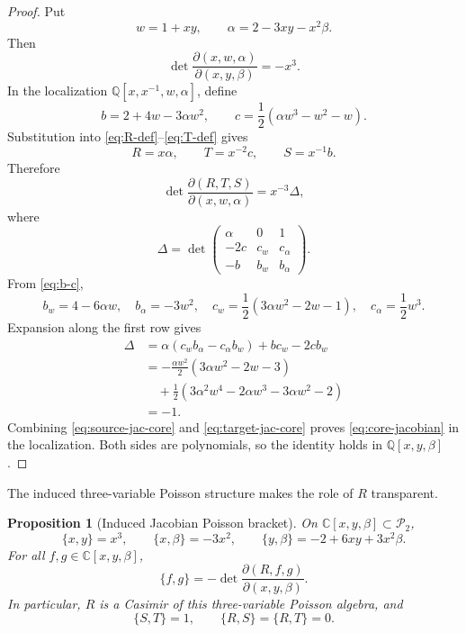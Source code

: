 \documentclass[11pt]{article}
\newcommand{\C}{\mathbb C}
\newcommand{\Q}{\mathbb Q}
\newcommand{\Pcal}{\mathcal P}
\newtheorem{proposition}[theorem]{Proposition}
\theoremstyle{remark}
\begin{document}
\begin{proof}
Put
\begin{equation}\label{eq:w-alpha}
  w=1+xy,
  \qquad
  \alpha=2-3xy-x^2\beta.
\end{equation}
Then
\begin{equation}\label{eq:source-jac-core}
  \det\frac{\partial(x,w,\alpha)}{\partial(x,y,\beta)}=-x^3.
\end{equation}
In the localization \(\Q[x,x^{-1},w,\alpha]\), define
\begin{equation}\label{eq:b-c}
  b=2+4w-3\alpha w^2,
  \qquad
  c=\frac12(\alpha w^3-w^2-w).
\end{equation}
Substitution into \eqref{eq:R-def}--\eqref{eq:T-def} gives
\begin{equation}\label{eq:RST-localized}
  R=x\alpha,
  \qquad
  T=x^{-2}c,
  \qquad
  S=x^{-1}b.
\end{equation}
Therefore
\begin{equation}\label{eq:target-jac-core}
  \det\frac{\partial(R,T,S)}{\partial(x,w,\alpha)}
  =x^{-3}\Delta,
\end{equation}
where
\[
  \Delta=
  \det
  \begin{pmatrix}
    \alpha&0&1\\
    -2c&c_w&c_\alpha\\
    -b&b_w&b_\alpha
  \end{pmatrix}.
\]
From \eqref{eq:b-c},
\[
  b_w=4-6\alpha w,
  \quad b_\alpha=-3w^2,
  \quad
  c_w=\frac12(3\alpha w^2-2w-1),
  \quad c_\alpha=\frac12w^3.
\]
Expansion along the first row gives
\begin{align*}
  \Delta
  &=\alpha(c_wb_\alpha-c_\alpha b_w)+bc_w-2cb_w\\
  &=-\frac{\alpha w^2}{2}(3\alpha w^2-2w-3)\\
  &\quad+\frac12(3\alpha^2w^4-2\alpha w^3-3\alpha w^2-2)\\
  &=-1.
\end{align*}
Combining \eqref{eq:source-jac-core} and
\eqref{eq:target-jac-core} proves \eqref{eq:core-jacobian} in the
localization.  Both sides are polynomials, so the identity holds in
\(\Q[x,y,\beta]\).
\end{proof}

The induced three-variable Poisson structure makes the role of \(R\)
transparent.

\begin{proposition}[Induced Jacobian Poisson bracket]\label{prop:induced-bracket}
On \(\C[x,y,\beta]\subset\Pcal_2\),
\begin{equation}\label{eq:induced-generator-brackets}
  \{x,y\}=x^3,
  \qquad
  \{x,\beta\}=-3x^2,
  \qquad
  \{y,\beta\}=-2+6xy+3x^2\beta.
\end{equation}
For all \(f,g\in\C[x,y,\beta]\),
\begin{equation}\label{eq:jacobian-bracket}
  \{f,g\}
  =-\det\frac{\partial(R,f,g)}{\partial(x,y,\beta)}.
\end{equation}
In particular, \(R\) is a Casimir of this three-variable Poisson algebra, and
\[
  \{S,T\}=1,
  \qquad
  \{R,S\}=\{R,T\}=0.
\]
\end{proposition}
\end{document}
